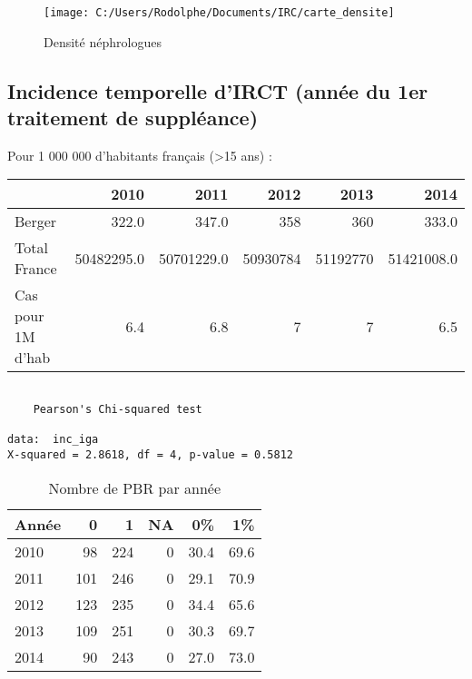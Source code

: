 \documentclass[11pt,a4paper]{article}\usepackage[]{graphicx}\usepackage[]{color}
\makeatletter
\newenvironment{kframe}{%
 \def\at@end@of@kframe{}%
 \ifinner\ifhmode%
  \def\at@end@of@kframe{\end{minipage}}%
  \begin{minipage}{\columnwidth}%
 \fi\fi%
 \def\FrameCommand##1{\hskip\@totalleftmargin \hskip-\fboxsep
 \colorbox{shadecolor}{##1}\hskip-\fboxsep
     \hskip-\linewidth \hskip-\@totalleftmargin \hskip\columnwidth}%
 \MakeFramed {\advance\hsize-\width
   \@totalleftmargin\z@ \linewidth\hsize
   \@setminipage}}%
 {\par\unskip\endMakeFramed%
 \at@end@of@kframe}
\newenvironment{knitrout}{}{} %
\makeatother
\begin{document}
\begin{figure}[H]
	\centering
	\texttt{[image: C:/Users/Rodolphe/Documents/IRC/carte\_densite]}
	\caption{Densité néphrologues}
	\label{fig:cartedensite}
\end{figure}

  \subsection{Incidence temporelle d'IRCT (année du 1er traitement de suppléance)}

Pour 1 000 000 d'habitants français (\textgreater 15 ans) :

\begin{table}[H]
\centering
\begin{tabular}{lrrrrr}
  \hline
 & 2010 & 2011 & 2012 & 2013 & 2014 \\ 
  \hline
Berger & 322.0 & 347.0 & 358 & 360 & 333.0 \\ 
  Total France & 50482295.0 & 50701229.0 & 50930784 & 51192770 & 51421008.0 \\ 
  Cas pour 1M d'hab & 6.4 & 6.8 & 7 & 7 & 6.5 \\ 
   \hline
\end{tabular}
\end{table}


\begin{knitrout}
\color{fgcolor}\begin{kframe}
\begin{verbatim}

	Pearson's Chi-squared test

data:  inc_iga
X-squared = 2.8618, df = 4, p-value = 0.5812
\end{verbatim}
\end{kframe}
\end{knitrout}

\begin{table}[H]
\centering
\begin{tabular}{lrrrrr}
  \hline
Année & 0 & 1 & NA & 0\% & 1\% \\ 
  \hline
2010 & 98 & 224 & 0 & 30.4 & 69.6 \\ 
  2011 & 101 & 246 & 0 & 29.1 & 70.9 \\ 
  2012 & 123 & 235 & 0 & 34.4 & 65.6 \\ 
  2013 & 109 & 251 & 0 & 30.3 & 69.7 \\ 
  2014 & 90 & 243 & 0 & 27.0 & 73.0 \\ 
   \hline
\end{tabular}
\caption{Nombre de PBR par année} 
\end{table}
\end{document}
